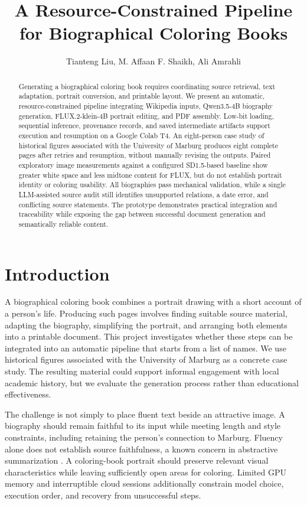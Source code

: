 \documentclass[11pt]{article}
\title{A Resource-Constrained Pipeline for Biographical Coloring Books}
\author{Tianteng Liu, M. Affaan F. Shaikh, Ali Amrahli}
\begin{document}
\maketitle

\begin{abstract}
Generating a biographical coloring book requires coordinating source retrieval, text adaptation, portrait conversion, and printable layout. We present an automatic, resource-constrained pipeline integrating Wikipedia inputs, Qwen3.5-4B biography generation, FLUX.2-klein-4B portrait editing, and PDF assembly. Low-bit loading, sequential inference, provenance records, and saved intermediate artifacts support execution and resumption on a Google Colab T4. An eight-person case study of historical figures associated with the University of Marburg produces eight complete pages after retries and resumption, without manually revising the outputs. Paired exploratory image measurements against a configured SD1.5-based baseline show greater white space and less midtone content for FLUX, but do not establish portrait identity or coloring usability. All biographies pass mechanical validation, while a single LLM-assisted source audit still identifies unsupported relations, a date error, and conflicting source statements. The prototype demonstrates practical integration and traceability while exposing the gap between successful document generation and semantically reliable content.
\end{abstract}

\section{Introduction}
\label{sec:introduction}

A biographical coloring book combines a portrait drawing with a short account of a person's life. Producing such pages involves finding suitable source material, adapting the biography, simplifying the portrait, and arranging both elements into a printable document. This project investigates whether these steps can be integrated into an automatic pipeline that starts from a list of names. We use historical figures associated with the University of Marburg as a concrete case study. The resulting material could support informal engagement with local academic history, but we evaluate the generation process rather than educational effectiveness.

The challenge is not simply to place fluent text beside an attractive image. A biography should remain faithful to its input while meeting length and style constraints, including retaining the person's connection to Marburg. Fluency alone does not establish source faithfulness, a known concern in abstractive summarization \citep{maynez-etal-2020-faithfulness}. A coloring-book portrait should preserve relevant visual characteristics while leaving sufficiently open areas for coloring. Limited GPU memory and interruptible cloud sessions additionally constrain model choice, execution order, and recovery from unsuccessful steps.
\end{document}
